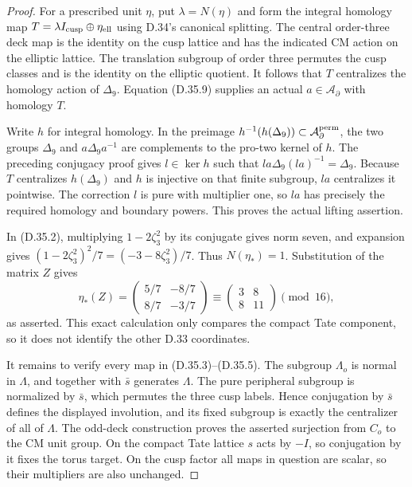 \begin{proof}
For a prescribed unit $\eta$, put $\lambda=N(\eta)$ and form the
integral homology map
$T=\lambda I_{\rm cusp}\oplus\eta_{\rm ell}$ using D.34's
canonical splitting. The central order-three deck map is the identity
on the cusp lattice and has the indicated CM action on the elliptic
lattice. The translation subgroup of order three permutes the cusp
classes and is the identity on the elliptic quotient. It follows that
$T$ centralizes the homology action of $\Delta_9$. Equation
(D.35.9) supplies an actual $a\in\mathcal A_{\partial}$ with
homology $T$.

Write $h$ for integral homology. In the preimage
$h^{-1}(h(\Delta_9))\subset\mathcal A_{\partial}^{\rm perm}$,
the two groups $\Delta_9$ and $a\Delta_9a^{-1}$ are complements
to the pro-two kernel of $h$. The preceding conjugacy proof gives
$l\in\ker h$ such that
$la\Delta_9(la)^{-1}=\Delta_9$. Because $T$ centralizes
$h(\Delta_9)$ and $h$ is injective on that finite subgroup,
$la$ centralizes it pointwise. The correction $l$ is pure with
multiplier one, so $la$ has precisely the required homology and
boundary powers. This proves the actual lifting assertion.

In (D.35.2), multiplying $1-2\zeta_3^2$ by its conjugate gives norm
seven, and expansion gives
$(1-2\zeta_3^2)^2/7=(-3-8\zeta_3^2)/7$.
Thus $N(\eta_*)=1$. Substitution of the matrix $Z$ gives
\[
 \eta_*(Z)=\begin{pmatrix}5/7&-8/7\\8/7&-3/7\end{pmatrix}
       \equiv\begin{pmatrix}3&8\\8&11\end{pmatrix}\pmod {16},
                                                               \tag{D.35.12}
\]
as asserted. This exact calculation only compares the compact Tate
component, so it does not identify the other D.33 coordinates.

It remains to verify every map in (D.35.3)--(D.35.5).
The subgroup $\Lambda_o$ is normal in $\Lambda$, and together with
$\bar s$ generates $\Lambda$. The pure peripheral subgroup is
normalized by $\bar s$, which permutes the three cusp labels. Hence
conjugation by $\bar s$ defines the displayed involution, and its
fixed subgroup is exactly the centralizer of all of $\Lambda$.
The odd-deck construction proves the asserted surjection from $C_o$
to the CM unit group. On the compact Tate lattice $s$ acts by $-I$,
so conjugation by it fixes the torus target. On the cusp factor all
maps in question are scalar, so their multipliers are also unchanged.


\end{proof}
